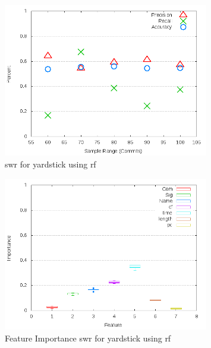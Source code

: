 \clearpage
\begin{figure}[!t]
\centering
\includegraphics[width=0.8\textwidth]{images/rf/test_1/yardstick_sample_range.png}
\caption{\gls{swr} for yardstick using \gls{rf}}
\label{fig:test_1_yardstick_rf}
\end{figure}

\begin{figure}[!t]
\centering
\includegraphics[width=0.8\textwidth]{images/rf/test_1/yardstick_importance.png}
\caption{Feature Importance \gls{swr} for yardstick using \gls{rf}}
\label{fig:test_1_yardstick_rf_importance}
\end{figure}

